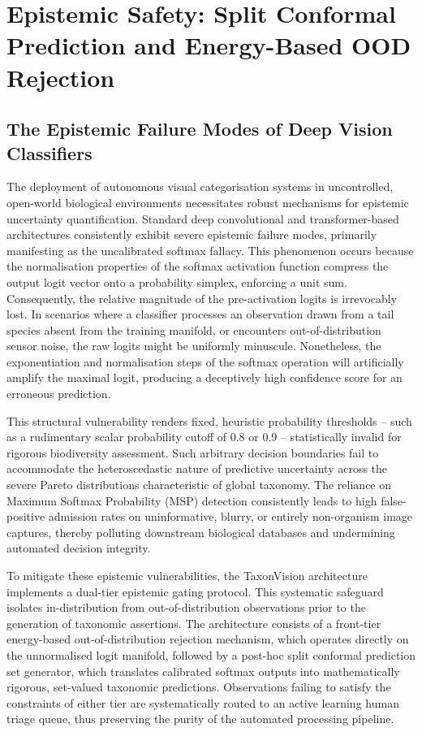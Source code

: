 \chapter{Epistemic Safety: Split Conformal Prediction and Energy-Based OOD Rejection}
\label{ch:epistemic_safety}

\section{The Epistemic Failure Modes of Deep Vision Classifiers}
\label{sec:epistemic_safety_problem}

The deployment of autonomous visual categorisation systems in uncontrolled, open-world biological environments necessitates robust mechanisms for epistemic uncertainty quantification. Standard deep convolutional and transformer-based architectures consistently exhibit severe epistemic failure modes, primarily manifesting as the uncalibrated softmax fallacy. This phenomenon occurs because the normalisation properties of the softmax activation function compress the output logit vector onto a probability simplex, enforcing a unit sum. Consequently, the relative magnitude of the pre-activation logits is irrevocably lost. In scenarios where a classifier processes an observation drawn from a tail species absent from the training manifold, or encounters out-of-distribution sensor noise, the raw logits might be uniformly minuscule. Nonetheless, the exponentiation and normalisation steps of the softmax operation will artificially amplify the maximal logit, producing a deceptively high confidence score for an erroneous prediction.

This structural vulnerability renders fixed, heuristic probability thresholds -- such as a rudimentary scalar probability cutoff of $0.8$ or $0.9$ -- statistically invalid for rigorous biodiversity assessment. Such arbitrary decision boundaries fail to accommodate the heteroscedastic nature of predictive uncertainty across the severe Pareto distributions characteristic of global taxonomy. The reliance on Maximum Softmax Probability (MSP) detection consistently leads to high false-positive admission rates on uninformative, blurry, or entirely non-organism image captures, thereby polluting downstream biological databases and undermining automated decision integrity.

To mitigate these epistemic vulnerabilities, the TaxonVision architecture implements a dual-tier epistemic gating protocol. This systematic safeguard isolates in-distribution from out-of-distribution observations prior to the generation of taxonomic assertions. The architecture consists of a front-tier energy-based out-of-distribution rejection mechanism, which operates directly on the unnormalised logit manifold, followed by a post-hoc split conformal prediction set generator, which translates calibrated softmax outputs into mathematically rigorous, set-valued taxonomic predictions. Observations failing to satisfy the constraints of either tier are systematically routed to an active learning human triage queue, thus preserving the purity of the automated processing pipeline.

